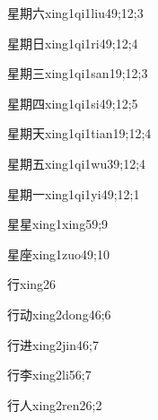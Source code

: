\begin{verbete}{星期六}{xing1qi1liu4}{9;12;3}
\end{verbete}
\begin{verbete}{星期日}{xing1qi1ri4}{9;12;4}
\end{verbete}
\begin{verbete}{星期三}{xing1qi1san1}{9;12;3}
\end{verbete}
\begin{verbete}{星期四}{xing1qi1si4}{9;12;5}
\end{verbete}
\begin{verbete}{星期天}{xing1qi1tian1}{9;12;4}
\end{verbete}
\begin{verbete}{星期五}{xing1qi1wu3}{9;12;4}
\end{verbete}
\begin{verbete}{星期一}{xing1qi1yi4}{9;12;1}
\end{verbete}
\begin{verbete}{星星}{xing1xing5}{9;9}
\end{verbete}
\begin{verbete}{星座}{xing1zuo4}{9;10}
\end{verbete}
\begin{verbete}{行}{xing2}{6}
\end{verbete}
\begin{verbete}{行动}{xing2dong4}{6;6}
\end{verbete}
\begin{verbete}{行进}{xing2jin4}{6;7}
\end{verbete}
\begin{verbete}{行李}{xing2li5}{6;7}
\end{verbete}
\begin{verbete}{行人}{xing2ren2}{6;2}
\end{verbete}
